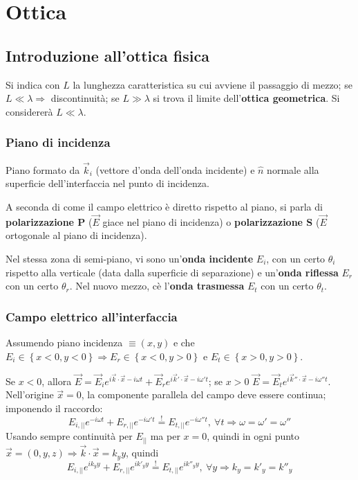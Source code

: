 \documentclass[a4paper]{scrartcl}
\numberwithin{equation}{subsection}
\theoremstyle{style1}
\begin{document}
\section{Ottica}
\subsection{Introduzione all'ottica fisica}

Si indica con $L$ la lunghezza caratteristica su cui avviene il passaggio di mezzo; se $L\ll \lambda \Rightarrow $ discontinuit\`a; se $L\gg\lambda $ si trova il limite dell'\textbf{ottica geometrica}. Si considerer\`a $L \ll \lambda $.

\subsubsection{Piano di incidenza}
Piano formato da $\vec{k}_i$ (vettore d'onda dell'onda incidente) e $\hat{n}$ normale alla superficie dell'interfaccia nel punto di incidenza.

A seconda di come il campo elettrico \`e diretto rispetto al piano, si parla di \textbf{polarizzazione P} ($\vec{E}$ giace nel piano di incidenza) o \textbf{polarizzazione S} ($\vec{E}$ ortogonale al piano di incidenza).

Nel stessa zona di semi-piano, vi sono un'\textbf{onda incidente} $E_i$, con un certo $\theta _i$ rispetto alla verticale (data dalla superficie di separazione) e un'\textbf{onda riflessa} $E_r$ con un certo $\theta _r$. Nel nuovo mezzo, c\`e l'\textbf{onda trasmessa} $E_t$ con un certo $\theta _t$. 

\subsubsection{Campo elettrico all'interfaccia}

Assumendo piano incidenza $\equiv (x,y)$ e che $E_i \in \left\{ x<0,y<0 \right\} \Rightarrow E_r \in \left\{ x<0,y>0 \right\} $ e $E_t \in \left\{ x>0, y>0 \right\} $.


Se $x<0$, allora $\vec{E}= \vec{E}_i e^{i \vec{k}\cdot \vec{x}-i\omega t} + \vec{E}_r e^{i \vec{k}'\cdot \vec{x}- i \omega' t} $; se $x>0$ $\vec{E}= \vec{E}_t e^{i \vec{k}'' \cdot \vec{x}-i\omega '' t} $. Nell'origine $\vec{x}=0$, la componente parallela del campo deve essere continua; imponendo il raccordo:
\begin{equation}
	E_{i, | |} e^{-i\omega t} + E_{r, | |} e^{-i\omega ' t} \stackrel{!}{=} E_{t, | |} e^{-i\omega '' t}, \ \forall  t \Rightarrow \omega=  \omega  ' = \omega''     
\end{equation}
Usando sempre continuit\`a per $E_{| |} $ ma per $x=0$, quindi in ogni punto $\vec{x} = (0,y,z) \Rightarrow \vec{k}\cdot \vec{x}= k_y y$, quindi
\begin{equation}
	E_{i, | |} e^{ik_y y } + E_{r, | |} e^{i k'_y y} \stackrel{!}{=} E_{t, | |} e^{i k''_y y}, \ \forall y\Rightarrow k_y = k'_y = k''_y      
\end{equation}
\end{document}
